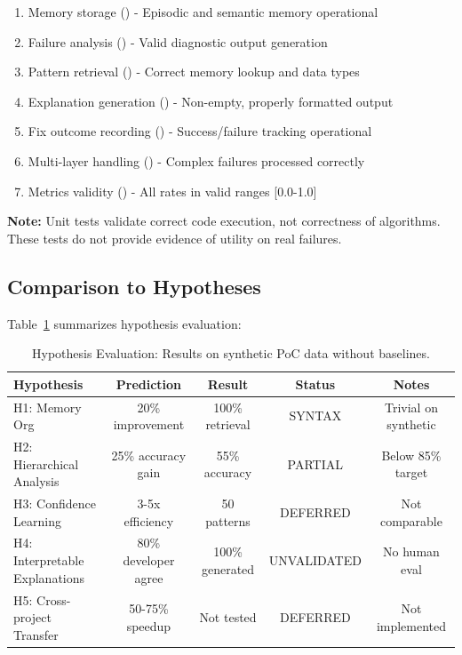\documentclass[11pt]{article}
\begin{document}
\begin{enumerate}
    \item Memory storage (\checkmark) - Episodic and semantic memory operational
    \item Failure analysis (\checkmark) - Valid diagnostic output generation
    \item Pattern retrieval (\checkmark) - Correct memory lookup and data types
    \item Explanation generation (\checkmark) - Non-empty, properly formatted output
    \item Fix outcome recording (\checkmark) - Success/failure tracking operational
    \item Multi-layer handling (\checkmark) - Complex failures processed correctly
    \item Metrics validity (\checkmark) - All rates in valid ranges [0.0-1.0]
\end{enumerate}

\textbf{Note:} Unit tests validate correct code execution, not correctness of algorithms. These tests do not provide evidence of utility on real failures.

\subsection{Comparison to Hypotheses}

Table~\ref{tab:hypotheses} summarizes hypothesis evaluation:

\begin{table}[h!]
\centering
\begin{tabular}{lcccc}
\toprule
\textbf{Hypothesis} & \textbf{Prediction} & \textbf{Result} & \textbf{Status} & \textbf{Notes} \\
\midrule
H1: Memory Org & 20\% improvement & 100\% retrieval & SYNTAX & Trivial on synthetic \\
H2: Hierarchical Analysis & 25\% accuracy gain & 55\% accuracy & PARTIAL & Below 85\% target \\
H3: Confidence Learning & 3-5x efficiency & 50 patterns & DEFERRED & Not comparable \\
H4: Interpretable Explanations & 80\% developer agree & 100\% generated & UNVALIDATED & No human eval \\
H5: Cross-project Transfer & 50-75\% speedup & Not tested & DEFERRED & Not implemented \\
\bottomrule
\end{tabular}
\caption{Hypothesis Evaluation: Results on synthetic PoC data without baselines.}
\label{tab:hypotheses}
\end{table}
\end{document}
